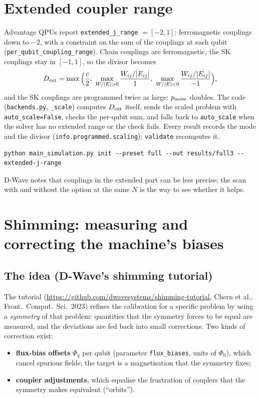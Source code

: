 \documentclass[11pt,a4paper]{article}
\newcommand{\code}[1]{\nolinkurl{#1}}
\begin{document}
\section{Extended coupler range}\label{sec:ext}
Advantage QPUs report \code{extended_j_range} $=[-2,1]$: ferromagnetic couplings down to $-2$, with a constraint on the sum of the couplings at each qubit (\code{per_qubit_coupling_range}). Chain couplings are ferromagnetic, the SK couplings stay in $[-1,1]$, so the divisor becomes
\begin{equation}
D_{\rm ext}=\max\Big(\frac{c}{2},\ \max_{W/|E|>0}\frac{W_{ij}/|E_{ij}|}{1},\ \max_{W/|E|<0}\frac{W_{ij}/|E_{ij}|}{-1}\Big),
\end{equation}
and the SK couplings are programmed twice as large: $p_{\rm noise}$ doubles. The code (\code{backends.py}, \code{_scale}) computes $D_{\rm ext}$ itself, sends the scaled problem with \code{auto_scale=False}, checks the per-qubit sum, and falls back to \code{auto_scale} when the solver has no extended range or the check fails. Every result records the mode and the divisor (\code{info.programmed.scaling}); \code{validate} recomputes it.
\begin{verbatim}
python main_simulation.py init --preset full --out results/full3 --extended-j-range
\end{verbatim}
D-Wave notes that couplings in the extended part can be less precise; the scan with and without the option at the same $N$ is the way to see whether it helps.

\section{Shimming: measuring and correcting the machine's biases}\label{sec:shim}
\subsection{The idea (D-Wave's shimming tutorial)}
The tutorial (\url{https://github.com/dwavesystems/shimming-tutorial}, Chern et al., Front.\ Comput.\ Sci.\ 2023) refines the calibration for a specific problem by using a \emph{symmetry} of that problem: quantities that the symmetry forces to be equal are measured, and the deviations are fed back into small corrections. Two kinds of correction exist:
\begin{itemize}
\item \textbf{flux-bias offsets} $\Phi_q$ per qubit (parameter \code{flux_biases}, units of $\Phi_0$), which cancel spurious fields; the target is a magnetisation that the symmetry fixes;
\item \textbf{coupler adjustments}, which equalise the frustration of couplers that the symmetry makes equivalent (``orbits'').
\end{itemize}
\end{document}
